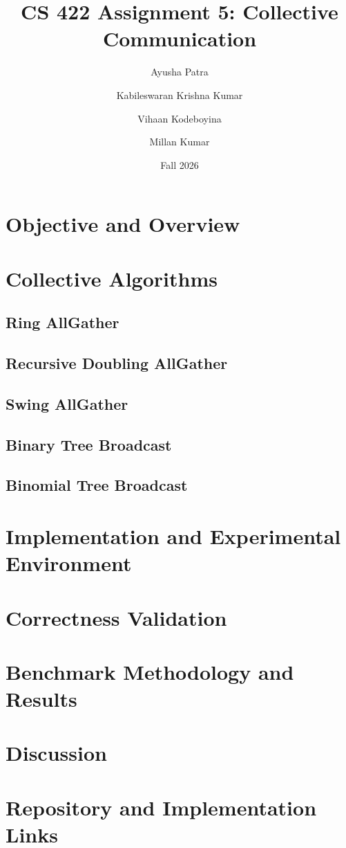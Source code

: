 \documentclass[11pt]{article}
\title{CS 422 Assignment 5: Collective Communication}
\author{Ayusha Patra \and Kabileswaran Krishna Kumar \and Vihaan Kodeboyina \and Millan Kumar}
\date{Fall 2026}
\begin{document}
\maketitle

\section{Objective and Overview}

\section{Collective Algorithms}
\subsection{Ring AllGather}
\subsection{Recursive Doubling AllGather}
\subsection{Swing AllGather}
\subsection{Binary Tree Broadcast}
\subsection{Binomial Tree Broadcast}

\section{Implementation and Experimental Environment}

\section{Correctness Validation}

\section{Benchmark Methodology and Results}

\section{Discussion}

\section{Repository and Implementation Links}
\end{document}
